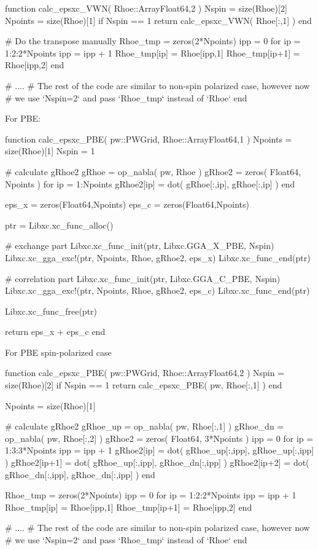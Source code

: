 \begin{juliacode}
function calc_epsxc_VWN( Rhoe::Array{Float64,2} )
    Nspin = size(Rhoe)[2]
    Npoints = size(Rhoe)[1]
    if Nspin == 1
        return calc_epsxc_VWN( Rhoe[:,1] )
    end

    # Do the transpose manually
    Rhoe_tmp = zeros(2*Npoints)
    ipp = 0
    for ip = 1:2:2*Npoints
        ipp = ipp + 1
        Rhoe_tmp[ip] = Rhoe[ipp,1]
        Rhoe_tmp[ip+1] = Rhoe[ipp,2]
    end

    # ....
    # The rest of the code are similar to non-spin polarized case, however now
    # we use `Nspin=2` and pass `Rhoe_tmp` instead of `Rhoe`
end
\end{juliacode}

For PBE:
\begin{juliacode}
function calc_epsxc_PBE( pw::PWGrid, Rhoe::Array{Float64,1} )
    Npoints = size(Rhoe)[1]
    Nspin = 1

    # calculate gRhoe2
    gRhoe = op_nabla( pw, Rhoe )
    gRhoe2 = zeros( Float64, Npoints )
    for ip = 1:Npoints
        gRhoe2[ip] = dot( gRhoe[:,ip], gRhoe[:,ip] )
    end

    eps_x = zeros(Float64,Npoints)
    eps_c = zeros(Float64,Npoints)

    ptr = Libxc.xc_func_alloc()

    # exchange part
    Libxc.xc_func_init(ptr, Libxc.GGA_X_PBE, Nspin)
    Libxc.xc_gga_exc!(ptr, Npoints, Rhoe, gRhoe2, eps_x)
    Libxc.xc_func_end(ptr)

    # correlation part
    Libxc.xc_func_init(ptr, Libxc.GGA_C_PBE, Nspin)
    Libxc.xc_gga_exc!(ptr, Npoints, Rhoe, gRhoe2, eps_c)
    Libxc.xc_func_end(ptr)

    Libxc.xc_func_free(ptr)

    return eps_x + eps_c
end
\end{juliacode}

For PBE spin-polarized case

\begin{juliacode}
function calc_epsxc_PBE( pw::PWGrid, Rhoe::Array{Float64,2} )
    Nspin = size(Rhoe)[2]
    if Nspin == 1
        return calc_epsxc_PBE( pw, Rhoe[:,1] )
    end

    Npoints = size(Rhoe)[1]

    # calculate gRhoe2
    gRhoe_up = op_nabla( pw, Rhoe[:,1] )
    gRhoe_dn = op_nabla( pw, Rhoe[:,2] )
    gRhoe2 = zeros( Float64, 3*Npoints )
    ipp = 0
    for ip = 1:3:3*Npoints
        ipp = ipp + 1
        gRhoe2[ip]   = dot( gRhoe_up[:,ipp], gRhoe_up[:,ipp] )
        gRhoe2[ip+1] = dot( gRhoe_up[:,ipp], gRhoe_dn[:,ipp] )
        gRhoe2[ip+2] = dot( gRhoe_dn[:,ipp], gRhoe_dn[:,ipp] )
    end

    Rhoe_tmp = zeros(2*Npoints)
    ipp = 0
    for ip = 1:2:2*Npoints
        ipp = ipp + 1
        Rhoe_tmp[ip] = Rhoe[ipp,1]
        Rhoe_tmp[ip+1] = Rhoe[ipp,2]
    end

    # ....
    # The rest of the code are similar to non-spin polarized case, however now
    # we use `Nspin=2` and pass `Rhoe_tmp` instead of `Rhoe`
end
\end{juliacode}


